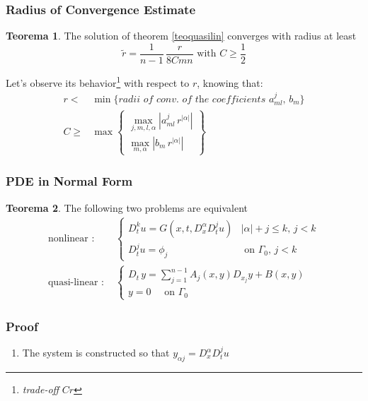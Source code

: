\documentclass[serif,notheorems]{beamer}
\theoremstyle{definition} %
\newtheorem{theorem}{Teorema}[section] %
\theoremstyle{remark}
\begin{document}
\begin{frame}
\frametitle{Radius of Convergence Estimate}
\begin{theorem}
The solution of theorem \ref{teoquasilin} converges with radius at least
$$\widetilde{r} = \dfrac{1}{n-1}\, \dfrac{r}{8Cmn} \text{ with } C \geq \frac{1}{2}$$
\end{theorem}

Let's observe its behavior\footnote{\textit{trade-off} $Cr$} with respect to $r$, knowing that:
\begin{align*}
r <& \min \{ \textit{radii of conv. of the coefficients } a^j_{ml}, \, b_m\} \\
C \geq & \max \begin{Bmatrix}
\max\limits_{j,m,l,\alpha } \left|a^j_{ml} \, r^{|\alpha |}\right|\\
\max\limits_{m,\alpha} \left|b_m \, r^{|\alpha |}\right|
\end{Bmatrix}
\end{align*}
\end{frame}

\begin{frame}
\frametitle{PDE in Normal Form}
\begin{theorem}
The following two problems are equivalent
\begin{align*}
\text{nonlinear : }&
\begin{cases}
D_{t}^k u = G(x,t, D^\alpha_x D^j_t u) & |\alpha |+ j \leq k, \, j<k \\
D_t^ju = \phi_j & \text{ on } \Gamma_0, \, j<k
\end{cases} \\
\text{quasi-linear : }&
\begin{cases}
D_t \, y = \sum\limits_{j=1}^{n-1} A_j(x,y)D_{x_j}y+B(x,y) \; \\
y=0 \quad \text{ on } \Gamma_0
\end{cases}
\end{align*}
\end{theorem}
\end{frame}

\begin{frame}
\frametitle{Proof}
\begin{enumerate}
\item The system is constructed so that $y_{\alpha j}= D^\alpha_x D^j_t u$
\end{enumerate}
\end{frame}
\end{document}
